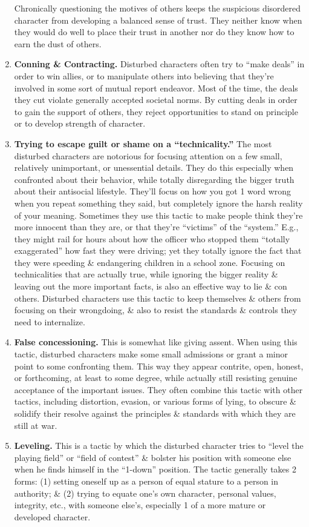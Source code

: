 \documentclass{article}
\numberwithin{equation}{section}
\begin{document}
\begin{enumerate}
	Chronically questioning the motives of others keeps the suspicious disordered character from developing a balanced sense of trust. They neither know when they would do well to place their trust in another nor do they know how to earn the dust of others.
	\item \textbf{Conning \& Contracting.} Disturbed characters often try to ``make deals'' in order to win allies, or to manipulate others into believing that they're involved in some sort of mutual report endeavor. Most of the time, the deals they cut violate generally accepted societal norms. By cutting deals in order to gain the support of others, they reject opportunities to stand on principle or to develop strength of character.
	\item \textbf{Trying to escape guilt or shame on a ``technicality.''} The most disturbed characters are notorious for focusing attention on a few small, relatively unimportant, or unessential details. They do this especially when confronted about their behavior, while totally disregarding the bigger truth about their antisocial lifestyle. They'll focus on how you got 1 word wrong when you repeat something they said, but completely ignore the harsh reality of your meaning. Sometimes they use this tactic to make people think they're more innocent than they are, or that they're ``victims'' of the ``system.'' E.g., they might rail for hours about how the officer who stopped them ``totally exaggerated'' how fast they were driving; yet they totally ignore the fact that they were speeding \& endangering children in a school zone. Focusing on technicalities that are actually true, while ignoring the bigger reality \& leaving out the more important facts, is also an effective way to lie \& con others. Disturbed characters use this tactic to keep themselves \& others from focusing on their wrongdoing, \& also to resist the standards \& controls they need to internalize.
	\item \textbf{False concessioning.} This is somewhat like giving assent. When using this tactic, disturbed characters make some small admissions or grant a minor point to some confronting them. This way they appear contrite, open, honest, or forthcoming, at least to some degree, while actually still resisting genuine acceptance of the important issues. They often combine this tactic with other tactics, including distortion, evasion, or various forms of lying, to obscure \& solidify their resolve against the principles \& standards with which they are still at war.
	\item \textbf{Leveling.} This is a tactic by which the disturbed character tries to ``level the playing field'' or ``field of contest'' \& bolster his position with someone else when he finds himself in the ``1-down'' position. The tactic generally takes 2 forms: (1) setting oneself up as a person of equal stature to a person in authority; \& (2) trying to equate one's own character, personal values, integrity, etc., with someone else's, especially 1 of a more mature or developed character.
	

\end{enumerate}
\end{document}
